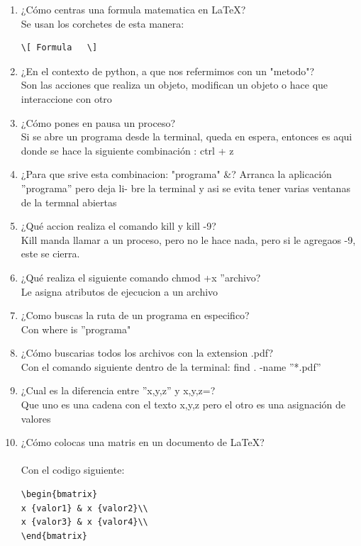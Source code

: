 \documentclass[letterpaper, 12pt, oneside]{article}%
\begin{document}
\begin{enumerate}
	\item ¿Cómo centras una formula matematica en \LaTeX?\\
	Se usan los corchetes de esta manera:  \begin{lstlisting}
\[ Formula   \]
	\end{lstlisting}
	
	\item ¿En el contexto de python, a que nos refermimos con un "metodo"?\\
	Son las acciones que realiza un objeto, modifican un
	objeto o hace que interaccione con otro
	
	\item ¿Cómo pones en pausa un proceso?\\
	Si se abre un programa desde la terminal, queda en espera, entonces es aqui donde se hace la siguiente combinación : ctrl + z
	
	\item ¿Para que srive esta combinacion: "programa" \&?
	Arranca la aplicación ”programa” pero deja li-
	bre la terminal y asi se evita tener varias ventanas de la termnal
	abiertas
	\item ¿Qué accion realiza el comando kill y kill -9?\\
Kill manda llamar a un proceso, pero no le hace nada, pero si le agregaos -9, este se cierra.
	\item ¿Qué realiza el siguiente comando chmod +x ”archivo?\\
		Le asigna atributos de ejecucion a un archivo
		
	\item ¿Como buscas la ruta de un programa en especifico?\\
	Con where is ”programa"
	
	\item ¿Cómo buscarias todos los archivos con la extension .pdf?\\
	Con el comando siguiente dentro de la terminal: find . -name ”*.pdf”
	
	\item ¿Cual es la diferencia entre ”x,y,z” y x,y,z=?\\
Que uno es una cadena con el texto x,y,z pero el otro es una asignación de valores

	\item ¿Cómo colocas una matris en un documento de \LaTeX?\\
	\\
	Con el codigo siguiente:
\begin{verbatim} 
\begin{bmatrix}
x {valor1} & x {valor2}\\
x {valor3} & x {valor4}\\
\end{bmatrix}
\end{verbatim}



\end{enumerate}
\end{document}
